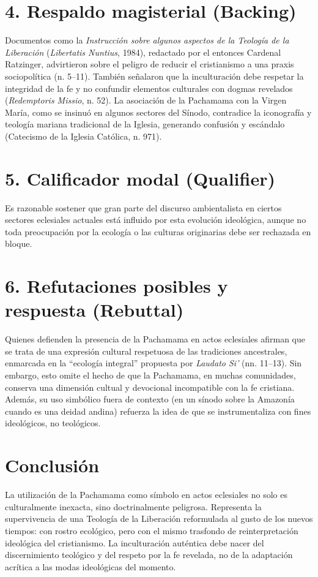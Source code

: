 \documentclass[12pt]{article}
\begin{document}
\section*{4. Respaldo magisterial (Backing)}
Documentos como la \textit{Instrucción sobre algunos aspectos de la Teología de la Liberación} (\textit{Libertatis Nuntius}, 1984), redactado por el entonces Cardenal Ratzinger, advirtieron sobre el peligro de reducir el cristianismo a una praxis sociopolítica (n. 5–11). También señalaron que la inculturación debe respetar la integridad de la fe y no confundir elementos culturales con dogmas revelados (\textit{Redemptoris Missio}, n. 52). La asociación de la Pachamama con la Virgen María, como se insinuó en algunos sectores del Sínodo, contradice la iconografía y teología mariana tradicional de la Iglesia, generando confusión y escándalo (Catecismo de la Iglesia Católica, n. 971).

\section*{5. Calificador modal (Qualifier)}
Es razonable sostener que gran parte del discurso ambientalista en ciertos sectores eclesiales actuales está influido por esta evolución ideológica, aunque no toda preocupación por la ecología o las culturas originarias debe ser rechazada en bloque.

\section*{6. Refutaciones posibles y respuesta (Rebuttal)}
Quienes defienden la presencia de la Pachamama en actos eclesiales afirman que se trata de una expresión cultural respetuosa de las tradiciones ancestrales, enmarcada en la “ecología integral” propuesta por \textit{Laudato Si’} (nn. 11–13). Sin embargo, esto omite el hecho de que la Pachamama, en muchas comunidades, conserva una dimensión cultual y devocional incompatible con la fe cristiana. Además, su uso simbólico fuera de contexto (en un sínodo sobre la Amazonía cuando es una deidad andina) refuerza la idea de que se instrumentaliza con fines ideológicos, no teológicos.

\section*{Conclusión}
La utilización de la Pachamama como símbolo en actos eclesiales no solo es culturalmente inexacta, sino doctrinalmente peligrosa. Representa la supervivencia de una Teología de la Liberación reformulada al gusto de los nuevos tiempos: con rostro ecológico, pero con el mismo trasfondo de reinterpretación ideológica del cristianismo. La inculturación auténtica debe nacer del discernimiento teológico y del respeto por la fe revelada, no de la adaptación acrítica a las modas ideológicas del momento.
\end{document}
